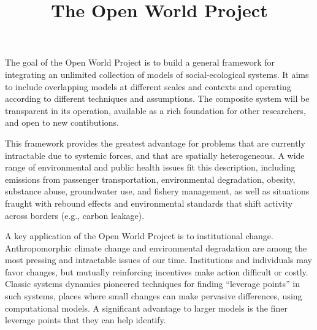 \documentclass[12pt, oneside]{amsart}
\title{The Open World Project}
\begin{document}
\maketitle





The goal of the Open World Project is to build a general framework for integrating an unlimited collection of models of social-ecological systems.  It aims to include overlapping models at different scales and contexts and operating according to different techniques and assumptions.  The composite system will be transparent in its operation, available as a rich foundation for other researchers, and open to new contibutions.


This framework provides the greatest advantage for problems that are currently intractable due to systemic forces, and that are spatially heterogeneous. A wide range of environmental and public health issues fit this description, including emissions from passenger transportation, environmental degradation, obesity, substance abuse, groundwater use, and fishery management, as well as situations fraught with rebound effects and environmental standards that shift activity across borders (e.g., carbon leakage).

A key application of the Open World Project is to institutional change.
Anthropomorphic climate change and environmental degradation are among the most pressing and intractable issues of our time. Institutions and individuals may favor changes, but mutually reinforcing incentives make action difficult or costly. Classic systems dynamics pioneered techniques for finding “leverage points” in such systems, places where small changes can make pervasive differences, using computational models.
A significant advantage to larger models is the finer leverage points that they can help identify.

\end{document}
